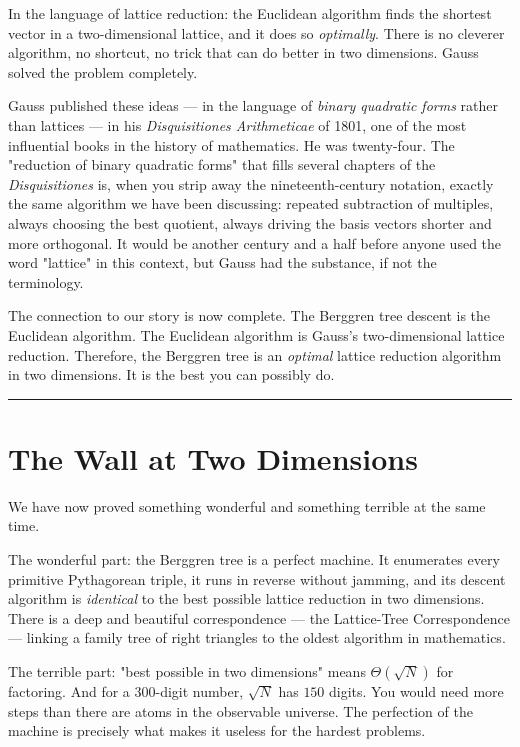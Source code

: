\documentclass[12pt, letterpaper, openany]{book}
\theoremstyle{definition}
\theoremstyle{remark}
\begin{document}
In the language of lattice reduction: the Euclidean algorithm finds the shortest vector in a two-dimensional lattice, and it does so \textit{optimally}. There is no cleverer algorithm, no shortcut, no trick that can do better in two dimensions. Gauss solved the problem completely.

Gauss published these ideas --- in the language of \textit{binary quadratic forms} rather than lattices --- in his \textit{Disquisitiones Arithmeticae} of 1801, one of the most influential books in the history of mathematics. He was twenty-four. The "reduction of binary quadratic forms" that fills several chapters of the \textit{Disquisitiones} is, when you strip away the nineteenth-century notation, exactly the same algorithm we have been discussing: repeated subtraction of multiples, always choosing the best quotient, always driving the basis vectors shorter and more orthogonal. It would be another century and a half before anyone used the word "lattice" in this context, but Gauss had the substance, if not the terminology.

The connection to our story is now complete. The Berggren tree descent is the Euclidean algorithm. The Euclidean algorithm is Gauss's two-dimensional lattice reduction. Therefore, the Berggren tree is an \textit{optimal} lattice reduction algorithm in two dimensions. It is the best you can possibly do.


\bigskip\noindent\rule{\textwidth}{0.4pt}\bigskip



\section*{The Wall at Two Dimensions}


We have now proved something wonderful and something terrible at the same time.

The wonderful part: the Berggren tree is a perfect machine. It enumerates every primitive Pythagorean triple, it runs in reverse without jamming, and its descent algorithm is \textit{identical} to the best possible lattice reduction in two dimensions. There is a deep and beautiful correspondence --- the Lattice-Tree Correspondence --- linking a family tree of right triangles to the oldest algorithm in mathematics.

The terrible part: "best possible in two dimensions" means $\Theta(\sqrt{N})$ for factoring. And for a $300$-digit number, $\sqrt{N}$ has $150$ digits. You would need more steps than there are atoms in the observable universe. The perfection of the machine is precisely what makes it useless for the hardest problems.
\end{document}
